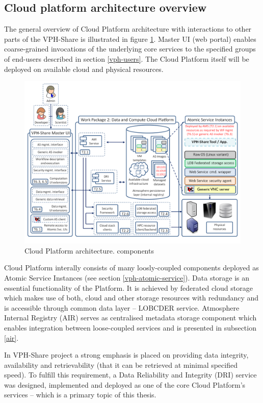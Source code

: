 \subsection{Cloud platform architecture overview}

The general overview of Cloud Platform architecture with interactions to other parts of
the VPH-Share is illustrated in figure \ref{fig:vph-architecture}. Master UI (web portal) enables
coarse-grained invocations of the underlying core services to the specified groups of
end-users described in section \ref{vph-users}. The Cloud Platform itself will be deployed on
available cloud and physical resources.

\begin{figure}[h!]
	\centering
	\includegraphics[width=\textwidth]{images/vph-architecture.png}
	\caption{Cloud Platform architecture. 
	components}
	\label{fig:vph-architecture}
\end{figure}

Cloud Platform interally consists of many loosly-coupled components deployed as Atomic Service
Instances (see section \ref{vph-atomic-service}). Data storage is an essential functionality of
the Platform. It is achieved by
federated cloud storage which makes use of both, cloud and other storage
resources with redundancy and is accessible through common data layer --
LOBCDER service. Atmosphere Internal Registry (AIR) serves as
centralised metadata storage component which enables integration between 
loose-coupled services and is presented in subsection \ref{air}.

In VPH-Share project a strong emphasis is placed on providing data integrity,
availability and retrievability (that it can be retrieved at minimal specified
speed). To fulfill this requirement, a Data Reliability and Integrity (DRI)
service was designed, implemented and deployed as one of the core Cloud
Platform's services -- which is a primary topic of this thesis.\\

